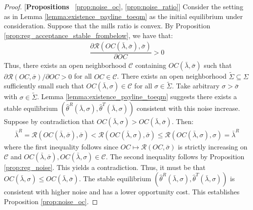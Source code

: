 \begin{proof}{[\textbf{Propositions} ~\ref{prop:noise_oc}, \ref{prop:noise_ratio}]} Consider the setting as in Lemma \ref{lemma:existence_payline_toeqm} as the initial equilibrium under consideration. Suppose that the mills ratio is convex. By Proposition \ref{prop:reg_acceptance_stable_frombelow}, we have that:
\begin{align*}
    \dfrac{\partial \mathcal{R}(OC(\bar{\lambda},\bar{\sigma}),\bar{\sigma})}{\partial OC} > 0
\end{align*}
Thus, there exists an open neighborhood $\mathcal{C}$ containing $OC(\bar{\lambda},\bar{\sigma})$ such that $\partial \mathcal{R}(OC,\bar{\sigma})/\partial OC >0$ for all $OC\in \mathcal{C}$. There exists an open neighborhood $\tilde{\Sigma}\subseteq \Sigma$ sufficiently small such that $OC(\bar{\lambda},\sigma)\in \mathcal{C}$ for all $\sigma\in\tilde{\Sigma}$. Take arbitrary $\sigma>\bar{\sigma}$ with $\sigma\in \tilde{\Sigma}$. Lemma \ref{lemma:existence_payline_toeqm} suggests there exists a stable equilibrium $(\hat{\theta}^R(\bar{\lambda},\sigma),\hat{\theta}^T(\bar{\lambda},\sigma))$ consistent with this noise increase. Suppose by contradiction that $OC(\bar{\lambda},\sigma) > OC(\bar{\lambda},\bar{\sigma})$. Then:
\begin{align*}
  \bar{\lambda}^R = \mathcal{R}(OC(\bar{\lambda},\bar{\sigma}),\bar{\sigma}) < \mathcal{R}(OC(\bar{\lambda},\sigma),\bar{\sigma}) \leq \mathcal{R}(OC(\bar{\lambda},\sigma),\sigma) = \bar{\lambda}^R
\end{align*}
where the first inequality follows since $OC\mapsto \mathcal{R}(OC,\bar{\sigma})$ is strictly increasing on $\mathcal{C}$ and $OC(\bar{\lambda},\bar{\sigma}),\allowbreak OC(\bar{\lambda},\sigma)\in \mathcal{C}$. The second inequality follows by Proposition \ref{prop:reg_noise}. This yields a contradiction. Thus, it must be that $OC(\bar{\lambda},\sigma) \leq OC(\bar{\lambda},\bar{\sigma})$. The stable equilibrium $(\hat{\theta}^R(\bar{\lambda},\sigma),\hat{\theta}^T(\bar{\lambda},\sigma))$ is consistent with higher noise and has a lower opportunity cost. This establishes Proposition \ref{prop:noise_oc}. 


\end{proof}
